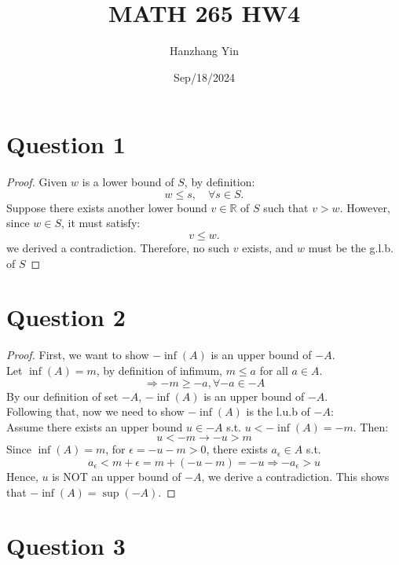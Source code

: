 \documentclass{article}
\title{MATH 265 HW4}
\author{Hanzhang Yin}
\date{Sep/18/2024}
\begin{document}
\maketitle

\section*{Question 1}
\begin{proof}
    Given \( w \) is a lower bound of \( S \), by definition:
    \[ w \leq s, \quad \forall s \in S. \]
    Suppose there exists another lower bound \( v \in \mathbb{R} \) of \( S \) such that \( v > w \).
    However, since \( w \in S \), it must satisfy:
    \[ v \leq w. \]
    we derived a contradiction.
    Therefore, no such \( v \) exists, and \( w \) must be the g.l.b. of $S$
\end{proof}

\section*{Question 2}
\begin{proof}
    First, we want to show $-\inf(A)$ is an upper bound of $-A$.
    \\
    Let $\inf(A) = m$, by definition of infimum, $m \leq a$ for all $a \in A$.
    \[ \Rightarrow -m \geq -a, \forall -a \in -A \]
    By our definition of set $-A$, $-\inf(A)$ is an upper bound of $-A$.
    \\
    Following that, now we need to show $-\inf(A)$ is the l.u.b of $-A$:
    \\
    Assume there exists an upper bound $u \in -A$ s.t. $u < -\inf(A) = -m$. Then:
    \[ u < -m \rightarrow -u > m \]
    Since $\inf(A) = m$, for $\epsilon = -u - m > 0$, there exists $a_{\epsilon} \in A$ s.t. 
    \[ a_{\epsilon} < m + \epsilon = m + (-u - m) = -u \Rightarrow -a_{\epsilon} > u \]
    Hence, $u$ is NOT an upper bound of $-A$, we derive a contradiction. This shows that $-\inf(A) = \sup(-A)$.
\end{proof}

\section*{Question 3}
\end{document}
